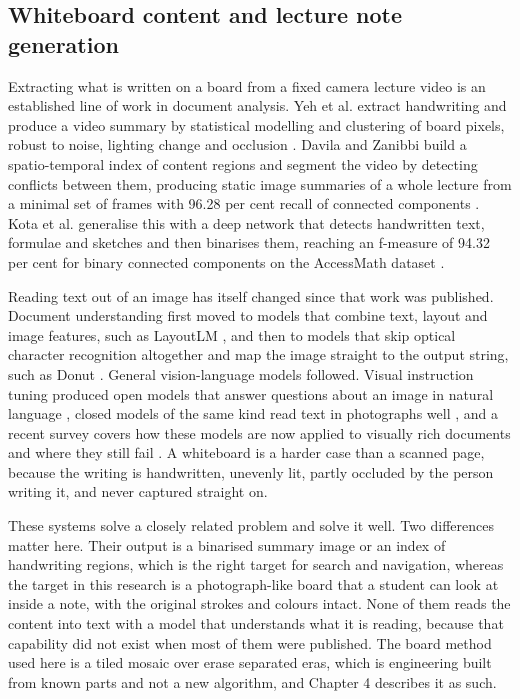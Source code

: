 \subsection{Whiteboard content and lecture note generation}

Extracting what is written on a board from a fixed camera lecture video is an established
line of work in document analysis. Yeh et al. extract handwriting and produce a video
summary by statistical modelling and clustering of board pixels, robust to noise,
lighting change and occlusion \cite{yeh2016robust}. Davila and Zanibbi build a
spatio-temporal index of content regions and segment the video by detecting conflicts
between them, producing static image summaries of a whole lecture from a minimal set of
frames with 96.28 per cent recall of connected components \cite{davila2017whiteboard}.
Kota et al. generalise this with a deep network that detects handwritten text, formulae
and sketches and then binarises them, reaching an f-measure of 94.32 per cent for binary
connected components on the AccessMath dataset \cite{kota2019generalized}.

Reading text out of an image has itself changed since that work was published. Document
understanding first moved to models that combine text, layout and image features, such as
LayoutLM \cite{xu2020layoutlm}, and then to models that skip optical character recognition
altogether and map the image straight to the output string, such as Donut
\cite{kim2022donut}. General vision-language models followed. Visual instruction tuning
produced open models that answer questions about an image in natural language
\cite{liu2023llava}, closed models of the same kind read text in photographs well
\cite{openai2023gpt4}, and a recent survey covers how these models are now applied to
visually rich documents and where they still fail \cite{ding2025vrdusurvey}. A whiteboard
is a harder case than a scanned page, because the writing is handwritten, unevenly lit,
partly occluded by the person writing it, and never captured straight on.

These systems solve a closely related problem and solve it well. Two differences matter
here. Their output is a binarised summary image or an index of handwriting regions, which
is the right target for search and navigation, whereas the target in this research is a
photograph-like board that a student can look at inside a note, with the original strokes
and colours intact. None of them reads the content into text with a model that
understands what it is reading, because that capability did not exist when most of them
were published. The board method used here is a tiled mosaic over erase separated eras,
which is engineering built from known parts and not a new algorithm, and Chapter 4
describes it as such.

